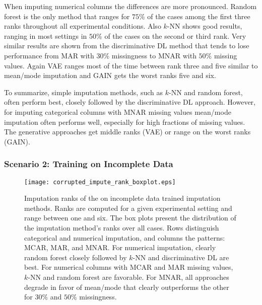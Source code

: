 When imputing numerical columns the differences are more pronounced. Random forest is the only method that ranges for $75\%$ of the cases among the first three ranks throughout all experimental conditions. Also $k$-NN shows good results, ranging in most settings in $50\%$ of the cases on the second or third rank. Very similar results are shown from the discriminative DL method that tends to lose performance from MAR with $30\%$ missingness to MNAR with $50\%$ missing values. Again VAE ranges most of the time between rank three and five similar to mean/mode imputation and GAIN gets the worst ranks five and six.

To summarize, simple imputation methods, such as $k$-NN and random forest, often perform best, closely followed by the discriminative DL approach. However, for imputing categorical columns with MNAR missing values mean/mode imputation often performs well, especially for high fractions of missing values. The generative approaches get middle ranks (VAE) or range on the worst ranks (GAIN).


\subsubsection{Scenario 2: Training on Incomplete Data}


\begin{figure}\centering
    \texttt{[image: corrupted\_impute\_rank\_boxplot.eps]}
    \caption[Imputation Ranks - Corrupted]{Imputation ranks of the on incomplete data trained imputation methods. Ranks are computed for a given experimental setting and range between one and six. The box plots present the distribution of the imputation method's ranks over all cases. Rows distinguish categorical and numerical imputation, and columns the patterns: MCAR, MAR, and MNAR. For numerical imputation, clearly random forest closely followed by $k$-NN and discriminative DL are best. For numerical columns with MCAR and MAR missing values, $k$-NN and random forest are favorable. For MNAR, all approaches degrade in favor of mean/mode that clearly outperforms the other for $30\%$ and $50\%$ missingness.}
	\label{fig:corrupted_impute_rank_boxplot}
\end{figure}

